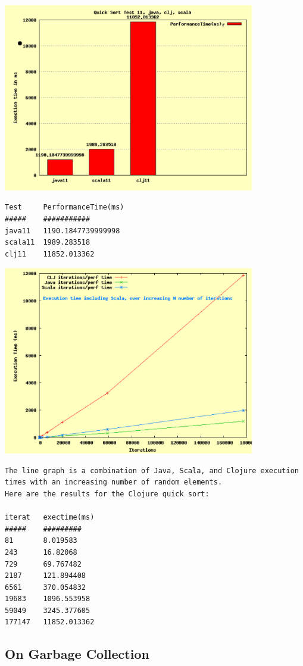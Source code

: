 \includegraphics[width=110mm]{chart1_scala_8.eps}
\begin{verbatim}
Test     PerformanceTime(ms)
#####    ########### 
java11   1190.1847739999998              
scala11  1989.283518            
clj11    11852.013362
\end{verbatim}

\includegraphics[width=110mm]{line_scala_freq.1__31.eps}

\begin{verbatim}
The line graph is a combination of Java, Scala, and Clojure execution 
times with an increasing number of random elements. 
Here are the results for the Clojure quick sort:

iterat   exectime(ms)
#####    #########
81       8.019583
243      16.82068
729      69.767482
2187     121.894408
6561     370.054832
19683    1096.553958
59049    3245.377605
177147   11852.013362
\end{verbatim}

\subsection{On Garbage Collection}

